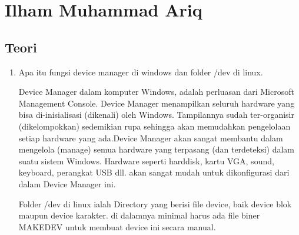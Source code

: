 \section{Ilham Muhammad Ariq}
\subsection{Teori}
\begin{enumerate}
    \item Apa itu fungsi device manager di windows dan folder /dev di linux.
   \par Device Manager dalam komputer Windows, adalah perluasan dari Microsoft Management Console. Device Manager menampilkan seluruh hardware yang bisa di-inisialisasi (dikenali) oleh Windows. Tampilannya sudah ter-organisir (dikelompokkan) sedemikian rupa sehingga akan memudahkan pengelolaan setiap hardware yang ada.Device Manager akan sangat membantu dalam mengelola (manage) semua hardware yang terpasang (dan terdeteksi) dalam suatu sistem Windows. Hardware seperti harddisk, kartu VGA, sound, keyboard, perangkat USB dll. akan sangat mudah untuk dikonfigurasi dari dalam Device Manager ini.
    
    
    \par Folder /dev di linux ialah Directory yang berisi file device, baik device blok maupun device karakter. di dalamnya minimal harus ada file biner MAKEDEV untuk membuat device ini secara manual.


\end{enumerate}
